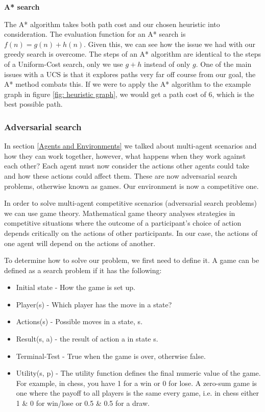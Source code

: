 \documentclass[]{final_report}
\begin{document}
\textbf{A* search}

The A* algorithm takes both path cost and our chosen heuristic into consideration. The evaluation function for an A* search is $f(n) = g(n) + h(n)$. Given this, we can see how the issue we had with our greedy search is overcome. The steps of an A* algorithm are identical to the steps of a Uniform-Cost search, only we use $g + h$ instead of only $g$. One of the main issues with a UCS is that it explores paths very far off course from our goal, the A* method combats this. If we were to apply the A* algorithm to the example graph in figure \ref{fig: heuristic graph}, we would get a path cost of 6, which is the best possible path. 

\subsubsection{\Large{Adversarial search}}

In section \ref{Agents and Environments} we talked about multi-agent scenarios and how they can work together, however, what happens when they work against each other? Each agent must now consider the actions other agents could take and how these actions could affect them. These are now adversarial search problems, otherwise known as games. Our environment is now a competitive one. 

In order to solve multi-agent competitive scenarios (adversarial search problems) we can use game theory. Mathematical game theory analyses strategies in competitive situations where the outcome of a participant's choice of action depends critically on the actions of other participants. In our case, the actions of one agent will depend on the actions of another. 

To determine how to solve our problem, we first need to define it. A game can be defined as a search problem if it has the following:

\begin{itemize}
    \item Initial state - How the game is set up.
    \item Player(s) - Which player has the move in a state?
    \item Actions(s) - Possible moves in a state, s.
    \item Result(s, a) - the result of action a in state s.
    \item Terminal-Test - True when the game is over, otherwise false.
    \item Utility(s, p) - The utility function defines the final numeric value of the game. For example, in chess, you have 1 for a win or 0 for lose. A zero-sum game is one where the payoff to all players is the same every game, i.e. in chess either 1 \& 0 for win/lose or 0.5 \& 0.5 for a draw.
\end{itemize}
\end{document}
